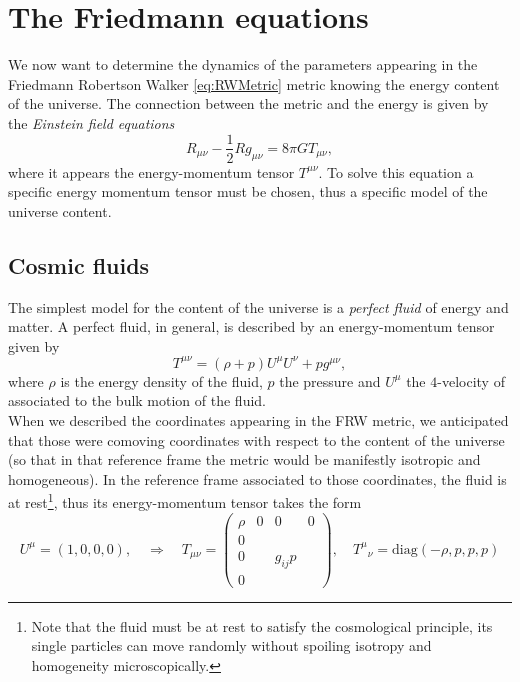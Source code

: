 \section{The Friedmann equations}
We now want to determine the dynamics of the parameters appearing in the Friedmann Robertson Walker \eqref{eq:RWMetric} metric knowing the energy content of the universe. The connection between the metric and the energy is given by the \emph{Einstein field equations}
\begin{equation}\label{eq:EFE}
    R_{\mu\nu}-\frac{1}{2}Rg_{\mu\nu}=8\pi GT_{\mu\nu},
\end{equation}
where it appears the energy-momentum tensor $T^{\mu\nu}$. To solve this equation a specific energy momentum tensor must be chosen, thus a specific model of the universe content.
\subsection{Cosmic fluids}
The simplest model for the content of the universe is a \emph{perfect fluid} of energy and matter. A perfect fluid, in general, is described by an energy-momentum tensor given by
\begin{equation}\label{eq:PerfectFluidEMTensor}
    T^{\mu\nu}=(\rho+p)U^\mu U^\nu+pg^{\mu\nu},
\end{equation}
where $\rho$ is the energy density of the fluid, $p$ the pressure and $U^\mu$ the $4$-velocity of associated to the bulk motion of the fluid.\\When we described the coordinates appearing in the FRW metric, we anticipated that those were comoving coordinates with respect to the content of the universe (so that in that reference frame the metric would be manifestly isotropic and homogeneous). In the reference frame associated to those coordinates, the fluid is at rest\footnote{Note that the fluid must be at rest to satisfy the cosmological principle, its single particles can move randomly without spoiling isotropy and homogeneity microscopically.}, thus its energy-momentum tensor takes the form
\begin{equation}
    U^\mu=(1,0,0,0),\quad\Rightarrow\quad
    T_{\mu\nu}=\begin{pmatrix}
        \rho&0&0&0\\
        0&&&\\
        0&&g_{ij}p&\\
        0&&&
    \end{pmatrix},
    \quad T^\mu\phantom{} _\nu=\text{diag}(-\rho,p,p,p)\label{eq:EMTensorCosmicFluid}
\end{equation}
